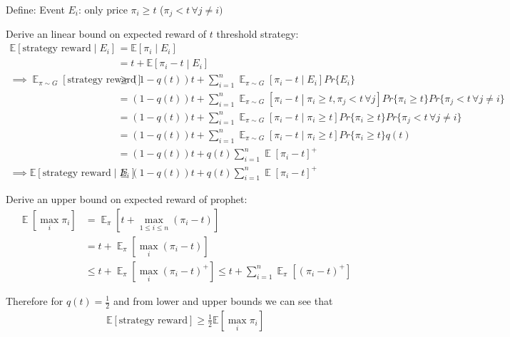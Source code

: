 \documentclass[11pt]{article}
\begin{document}
Define:
Event \(E_i\): only price \(\pi_i \geq t\) (\(\pi_j < t\, \forall j \neq i)\)


Derive an linear bound on expected reward of \(t\) threshold strategy:
\begin{align*}
\mathbb{E} \left[\text{strategy reward} \middle| E_i \right] &= \mathbb{E} \left[ \pi_i \middle| E_i \right] \\
&= t + \mathbb{E} \left[ \pi_i - t \middle| E_i \right]\\
\implies \mathop{\mathbb{E}}_{\pi \sim G} \left[ \text{strategy reward} \right]
&\geq (1 - q(t))t + \sum_{i=1}^n \mathop{\mathbb{E}}_{\pi \sim G} \left[ \pi_i - t \middle| E_i \right] Pr \{E_i\}  \\
&= (1 - q(t))t + \sum_{i=1}^n \mathop{\mathbb{E}}_{\pi \sim G} \left[ \pi_i - t \middle| \pi_i \geq t, \pi_j < t \, \forall j  \right] Pr \{\pi_i \geq t\} Pr \{\pi_j < t \, \forall j \neq i\}  \\
&= (1 - q(t))t + \sum_{i=1}^n \mathop{\mathbb{E}}_{\pi \sim G} \left[ \pi_i - t \middle| \pi_i \geq t \right] Pr \{\pi_i \geq t\} Pr \{\pi_j < t \, \forall j \neq i\}  \\
&= (1 - q(t))t + \sum_{i=1}^n \mathop{\mathbb{E}}_{\pi \sim G} \left[ \pi_i - t \middle| \pi_i \geq t \right] Pr \{\pi_i \geq t\} q(t)  \\
&= (1 - q(t))t +  q(t)\sum_{i=1}^n \mathop{\mathbb{E}} \left[ \pi_i - t \right]^{+}   \\
\implies \mathbb{E} \left[\text{strategy reward} \middle| E_i \right] &\geq (1 - q(t))t +  q(t)\sum_{i=1}^n \mathop{\mathbb{E}} \left[ \pi_i - t \right]^{+}
\end{align*}

Derive an upper bound on expected reward of prophet:
\begin{align*}
\mathop{\mathbb{E}} \left[ \max_i \pi_i \right] &= \mathop{\mathbb{E}}_{\pi} \left[ t + \max_{1 \leq i \leq n} (\pi_i - t) \right] \\
&= t + \mathop{\mathbb{E}}_{\pi} \left[ \max_i (\pi_i - t) \right] \\
&\leq t + \mathop{\mathbb{E}}_{\pi} \left[ \max_i (\pi_i - t)^+ \right] \leq t + \sum_{i=1}^n \mathop{\mathbb{E}}_{\pi} \left[ (\pi_i - t)^+ \right]
\end{align*}

Therefore for \(q(t) = \frac{1}{2}\) and from lower and upper bounds we can see that
\begin{align*}
\mathbb{E} \left[ \text{strategy reward} \right] \geq \frac{1}{2} \mathbb{E} \left[ \max_i \pi_i \right]
\end{align*}
\end{document}
